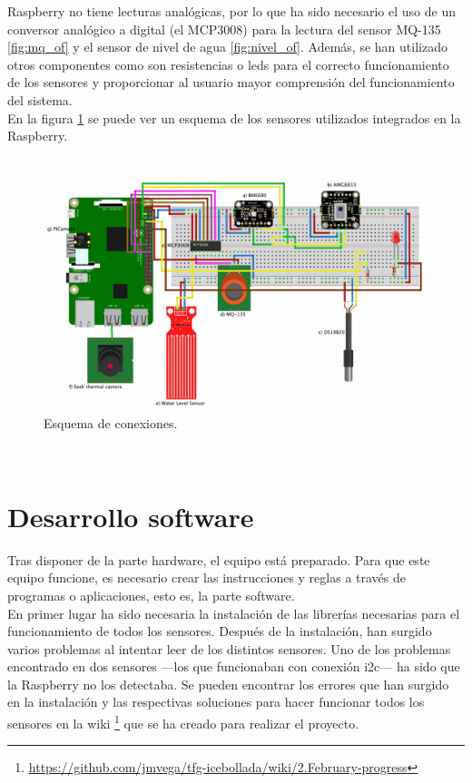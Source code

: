 Raspberry no tiene lecturas analógicas, por lo que ha sido necesario el uso de un conversor analógico a digital (el MCP3008) para la lectura del sensor MQ-135 \ref{fig:mq_of} y el sensor de nivel de agua \ref{fig:nivel_of}. Además, se han utilizado otros componentes como son resistencias o leds para el correcto funcionamiento de los sensores y proporcionar al usuario mayor comprensión del funcionamiento del sistema.\\

En la figura \ref{fig:esquema} se puede ver un esquema de los sensores utilizados integrados en la Raspberry.
\begin{figure} [h!]
  \begin{center}
    \includegraphics[width=14cm]{figs/esquema}
  \end{center}
  \caption{Esquema de conexiones.}
  \label{fig:esquema}
\end{figure}\\

\section{Desarrollo software}
Tras disponer de la parte hardware, el equipo está preparado. Para que este equipo funcione, es necesario crear las instrucciones y reglas a través de programas o aplicaciones, esto es, la parte software.\\

En primer lugar ha sido necesaria la instalación de las librerías necesarias para el funcionamiento de todos los sensores. Después de la instalación, han surgido varios problemas al intentar leer de los distintos sensores. Uno de los problemas encontrado en dos sensores ---los que funcionaban con conexión i2c--- ha sido que la Raspberry no los detectaba. Se pueden encontrar los errores que han surgido en la instalación y las respectivas soluciones para hacer funcionar todos los sensores en la wiki \footnote{\url{https://github.com/jmvega/tfg-icebollada/wiki/2.February-progress}} que se ha creado para realizar el proyecto.\\

